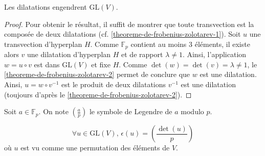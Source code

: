 
  \begin{lemma}
    \label{theoreme-de-frobenius-zolotarev-3}
    Les dilatations engendrent $\mathrm{GL}(V)$.
  \end{lemma}

  \begin{proof}
    Pour obtenir le résultat, il suffit de montrer que toute transvection est la composée de deux dilatations (cf. \cref{theoreme-de-frobenius-zolotarev-1}). Soit $u$ une transvection d'hyperplan $H$. Comme $\mathbb{F}_p$ contient au moins $3$ éléments, il existe alors $v$ une dilatation d'hyperplan $H$ et de rapport $\lambda \neq 1$.
    \newpar
    Ainsi, l'application $w = u \circ v$ est dans $\mathrm{GL}(V)$ et fixe $H$. Comme $\det(w) = \det(v) = \lambda \neq 1$, le \cref{theoreme-de-frobenius-zolotarev-2} permet de conclure que $w$ est une dilatation. Ainsi, $u = w \circ v^{-1}$ est le produit de deux dilatations $v^{-1}$ est une dilatation (toujours d'après le \cref{theoreme-de-frobenius-zolotarev-2}).
  \end{proof}

  \begin{notation}
    Soit $a \in \mathbb{F}_p$. On note $\left( \frac{a}{p} \right)$ le symbole de Legendre de $a$ modulo $p$.
  \end{notation}

  \begin{theorem}
    \[ \forall u \in \mathrm{GL}(V), \, \epsilon(u) = \left( \frac{\det(u)}{p} \right) \]
    où $u$ est vu comme une permutation des éléments de $V$.
  \end{theorem}

